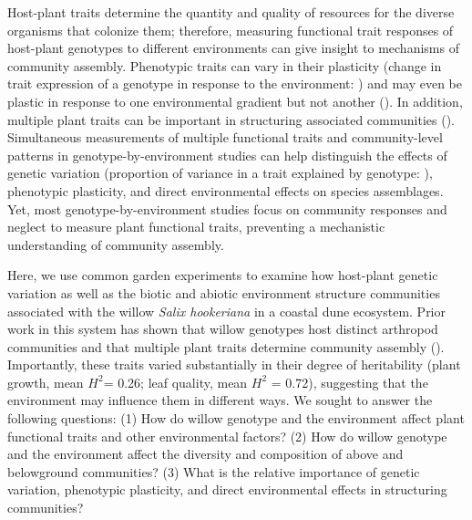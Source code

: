 \documentclass[11pt]{article}
\begin{document}
Host-plant traits determine the quantity and quality of resources for
the diverse organisms that colonize them; therefore, measuring
functional trait responses of host-plant genotypes to different
environments can give insight to mechanisms of community assembly. Phenotypic traits can vary in their
plasticity (change in trait expression of a genotype in response to the
environment: \citealt{Scheiner_1993}) and may even be plastic in response to
one environmental gradient but not another
(\citealt{Scheiner_1993, Scheiner_1984, Garbutt_1987}). In addition,
multiple plant traits can be important in structuring associated
communities
(\citealt{Barbour_2015, Barbour_2016, Agrawal_2006, agrawal2005natural, Agrawal_2004}).
Simultaneous measurements of multiple functional traits and
community-level patterns in genotype-by-environment studies can
help distinguish the effects of genetic variation (proportion of
variance in a trait explained by genotype: \citealt{lynch1998genetics}),
phenotypic plasticity, and direct environmental effects on species
assemblages. Yet, most genotype-by-environment studies focus on community responses and neglect to measure plant functional traits, preventing a mechanistic understanding of community assembly. 

Here, we use common garden experiments to examine how host-plant
genetic variation as well as the biotic and abiotic environment
structure communities associated with the willow \emph{Salix hookeriana}
in a coastal dune ecosystem. Prior work in this system has shown that
willow genotypes host distinct arthropod communities and that multiple
plant traits determine community assembly
(\citealt{Barbour_2015, Barbour_2016}). Importantly, these traits varied
substantially in their degree of heritability (plant growth, mean
\(H^2\)= 0.26; leaf quality, mean \(H^2\) = 0.72),
suggesting that the environment may influence them in different ways. We
sought to answer the following questions: (1) How do willow genotype and the environment affect plant functional traits and other environmental factors? 
(2) How do willow genotype and the environment affect the diversity and composition of above and belowground communities?
(3) What is the relative importance of genetic
variation, phenotypic plasticity, and direct environmental effects in
structuring communities?
\end{document}
